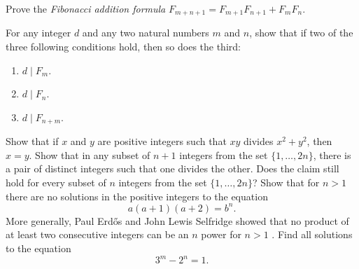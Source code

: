 \begin{challenge}
  \exercise
  \label{exercise:addition-formula-fibonacci}
  \begin{subexenum}
  \item Prove the \emph{Fibonacci addition formula} $F_{m+n+1} = F_{m+1}F_{n+1} + F_{m}F_{n}$.
  \item For any integer $d$ and any two natural numbers $m$ and $n$, show that if two of the three following conditions hold, then so does the third:
    \begin{enumerate}
    \item $d\mid F_m$.
    \item $d\mid F_n$.
    \item $d\mid F_{n+m}$.
    \end{enumerate}
  \end{subexenum}
  \exercise
  \label{exercise:div-product-sum-of-squares}
  Show that if $x$ and $y$ are positive integers such that $xy$ divides $x^2+y^2$, then $x=y$.
  \exercise Show that in any subset of $n+1$ integers from the set $\{1,\ldots,2n\}$, there is a pair of distinct integers such that one divides the other. Does the claim still hold for every subset of $n$ integers from the set $\{1,\ldots,2n\}$?
  \exercise Show that for $n>1$ there are no solutions in the positive integers to the equation
  \begin{equation*}
    a(a+1)(a+2)=b^n.
  \end{equation*}
  More generally, Paul Erd\H{o}s and John Lewis Selfridge showed that no product of at least two consecutive integers can be an $n$\supth{} power for $n>1$ \cite{erdosselfridge1975}.
  \exercise Find all solutions to the equation
  \begin{equation*}
    3^m-2^n=1.
  \end{equation*}
\end{challenge}


